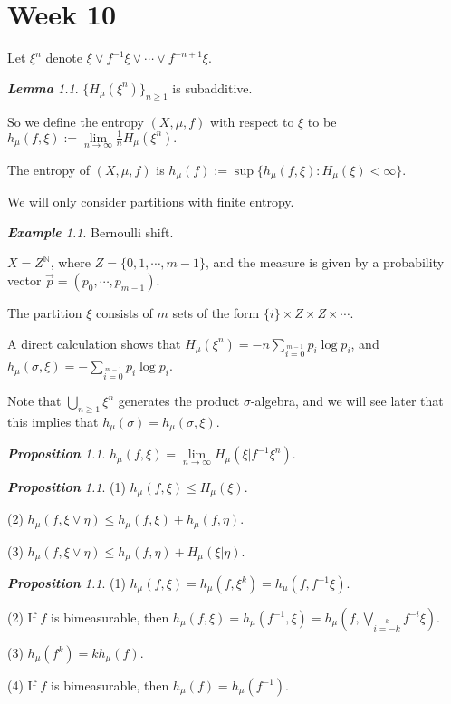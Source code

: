 \documentclass[10pt, a4paper, oneside]{report}
\numberwithin{equation}{chapter}
\theoremstyle{remark}
\newtheorem{lemma}[definition]{\bf{Lemma}}
\newtheorem{proposition}[definition]{\bf{Proposition}}
\theoremstyle{remark}
\newtheorem{example}{\bf{Example}}[chapter]
\begin{document}
\chapter{Week 10}
Let $\xi^n$ denote $\xi\vee f^{-1}\xi\vee\cdots\vee f^{-n+1}\xi$.

\begin{lemma}
    $\{H_\mu(\xi^n)\}_{n\geqslant 1}$ is subadditive.
\end{lemma}

So we define the entropy $(X,\mu,f)$ with respect to $\xi$ to be $h_\mu(f,\xi):=\lim\limits_{n\to\infty}\frac{1}{n}H_\mu(\xi^n).$

The entropy of $(X,\mu,f)$ is $h_\mu(f):=\sup\{h_\mu(f,\xi):H_\mu(\xi)<\infty\}$.

We will only consider partitions with finite entropy.

\begin{example}
Bernoulli shift.

    $X=Z^\mathbb{N}$, where $Z=\{0,1,\cdots,m-1\}$, and the measure is given by a probability vector $\vec{p}=(p_0,\cdots,p_{m-1})$.

    The partition $\xi$ consists of $m$ sets of the form $\{i\}\times Z\times Z\times\cdots$.

    A direct calculation shows that $H_\mu(\xi^n)=-n\sum\limits_{i=0}\limits^{m-1}p_i\log p_i$, and $h_\mu(\sigma,\xi)=-\sum\limits_{i=0}\limits^{m-1}p_i\log p_i$.

    Note that $\bigcup\limits_{n\geqslant 1}\xi^n$ generates the product $\sigma$-algebra, and we will see later that this implies that $h_\mu(\sigma)=h_\mu(\sigma,\xi)$.
\end{example}

\begin{proposition}
    $h_\mu(f,\xi)=\lim\limits_{n\to\infty}H_\mu(\xi|f^{-1}\xi^n)$.
\end{proposition}

\begin{proposition}
    (1) $h_\mu(f,\xi)\leqslant H_\mu(\xi)$.

    (2) $h_\mu(f,\xi\vee\eta)\leqslant h_\mu(f,\xi)+h_\mu(f,\eta)$.

    (3) $h_\mu(f,\xi\vee\eta)\leqslant h_\mu(f,\eta)+H_\mu(\xi|\eta).$
\end{proposition}

\begin{proposition}
    (1) $h_\mu(f,\xi)=h_\mu(f,\xi^k)=h_\mu(f,f^{-1}\xi).$

    (2) If $f$ is bimeasurable, then $h_\mu(f,\xi)=h_\mu(f^{-1},\xi)=h_\mu(f,\bigvee\limits_{i=-k}\limits^k f^{-i}\xi)$.

    (3) $h_\mu(f^k)=kh_\mu(f)$.

    (4) If $f$ is bimeasurable, then $h_\mu(f)=h_\mu(f^{-1}).$
\end{proposition}
\end{document}
